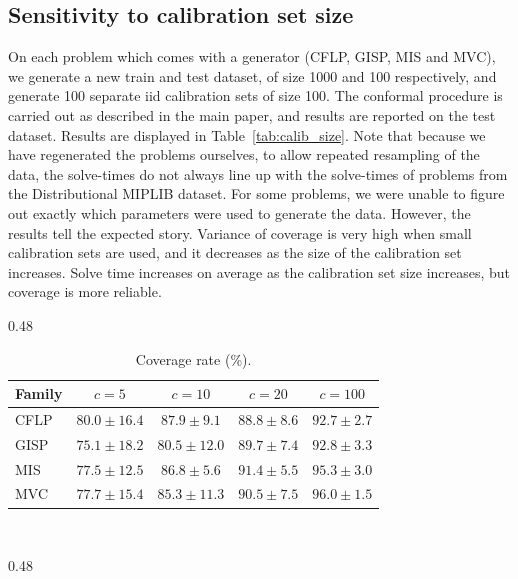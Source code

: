 \documentclass[12pt]{article}
\theoremstyle{definition}
\theoremstyle{remark}
\theoremstyle{plain}
\theoremstyle{definition}
\theoremstyle{remark}
\begin{document}
{\subsection{Sensitivity to calibration set size}
On each problem which comes with a generator (CFLP, GISP, MIS and MVC), we generate a new train and test dataset, of size 1000 and 100 respectively, and generate 100 separate iid calibration sets of size 100.
The conformal procedure is carried out as described in the main paper, and results are reported on the test dataset.
Results are displayed in Table~\ref{tab:calib_size}.
Note that because we have regenerated the problems ourselves, to allow repeated resampling of the data, the solve-times do not always line up with the solve-times of problems from the Distributional MIPLIB dataset. 
For some problems, we were unable to figure out exactly which parameters were used to generate the data.
However, the results tell the expected story. Variance of coverage is very high when small calibration sets are used, and it decreases as the size of the calibration set increases.
Solve time increases on average as the calibration set size increases, but coverage is more reliable.
\begin{table}[ht]
\centering
\caption{Effect of the calibration set size $c$ on coverage and solve time.}
\label{tab:calib_size}
\ifarxiv
\begin{subtable}{\textwidth}
\else
\begin{subtable}{0.48\textwidth}
\fi
\centering
\small
\setlength{\tabcolsep}{4pt}
\caption{Coverage rate (\%).}
\label{tab:calib_coverage}
\begin{tabular}{lcccc}
\toprule
Family & $c=5$ & $c=10$ & $c=20$ & $c=100$ \\
\midrule
CFLP & $80.0 \pm 16.4$ & $87.9 \pm 9.1$  & $88.8 \pm 8.6$ & $92.7 \pm 2.7$ \\
GISP & $75.1 \pm 18.2$ & $80.5 \pm 12.0$ & $89.7 \pm 7.4$ & $92.8 \pm 3.3$ \\
MIS  & $77.5 \pm 12.5$ & $86.8 \pm 5.6$  & $91.4 \pm 5.5$ & $95.3 \pm 3.0$ \\
MVC  & $77.7 \pm 15.4$ & $85.3 \pm 11.3$ & $90.5 \pm 7.5$ & $96.0 \pm 1.5$ \\
\bottomrule
\end{tabular}
\end{subtable}\ifarxiv\\\medskip\else\hfill\fi
\ifarxiv
\begin{subtable}{\textwidth}
\else
\begin{subtable}{0.48\textwidth}

\end{subtable}
\end{subtable}
\end{subtable}
\end{table}}
\end{document}
